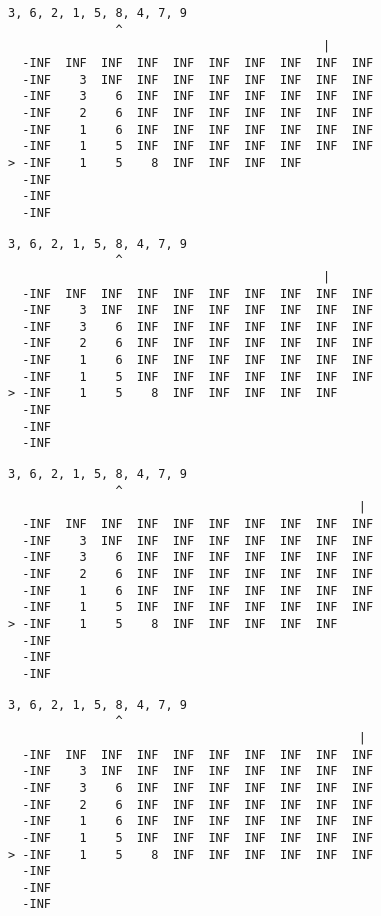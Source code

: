 { \begin{verbatim}
3, 6, 2, 1, 5, 8, 4, 7, 9
               ^
                                            |
  -INF  INF  INF  INF  INF  INF  INF  INF  INF  INF
  -INF    3  INF  INF  INF  INF  INF  INF  INF  INF
  -INF    3    6  INF  INF  INF  INF  INF  INF  INF
  -INF    2    6  INF  INF  INF  INF  INF  INF  INF
  -INF    1    6  INF  INF  INF  INF  INF  INF  INF
  -INF    1    5  INF  INF  INF  INF  INF  INF  INF
> -INF    1    5    8  INF  INF  INF  INF          
  -INF                                             
  -INF                                             
  -INF                                             
\end{verbatim} }

{ \begin{verbatim}
3, 6, 2, 1, 5, 8, 4, 7, 9
               ^
                                            |
  -INF  INF  INF  INF  INF  INF  INF  INF  INF  INF
  -INF    3  INF  INF  INF  INF  INF  INF  INF  INF
  -INF    3    6  INF  INF  INF  INF  INF  INF  INF
  -INF    2    6  INF  INF  INF  INF  INF  INF  INF
  -INF    1    6  INF  INF  INF  INF  INF  INF  INF
  -INF    1    5  INF  INF  INF  INF  INF  INF  INF
> -INF    1    5    8  INF  INF  INF  INF  INF     
  -INF                                             
  -INF                                             
  -INF                                             
\end{verbatim} }

{ \begin{verbatim}
3, 6, 2, 1, 5, 8, 4, 7, 9
               ^
                                                 |
  -INF  INF  INF  INF  INF  INF  INF  INF  INF  INF
  -INF    3  INF  INF  INF  INF  INF  INF  INF  INF
  -INF    3    6  INF  INF  INF  INF  INF  INF  INF
  -INF    2    6  INF  INF  INF  INF  INF  INF  INF
  -INF    1    6  INF  INF  INF  INF  INF  INF  INF
  -INF    1    5  INF  INF  INF  INF  INF  INF  INF
> -INF    1    5    8  INF  INF  INF  INF  INF     
  -INF                                             
  -INF                                             
  -INF                                             
\end{verbatim} }

{ \begin{verbatim}
3, 6, 2, 1, 5, 8, 4, 7, 9
               ^
                                                 |
  -INF  INF  INF  INF  INF  INF  INF  INF  INF  INF
  -INF    3  INF  INF  INF  INF  INF  INF  INF  INF
  -INF    3    6  INF  INF  INF  INF  INF  INF  INF
  -INF    2    6  INF  INF  INF  INF  INF  INF  INF
  -INF    1    6  INF  INF  INF  INF  INF  INF  INF
  -INF    1    5  INF  INF  INF  INF  INF  INF  INF
> -INF    1    5    8  INF  INF  INF  INF  INF  INF
  -INF                                             
  -INF                                             
  -INF                                             
\end{verbatim} }

